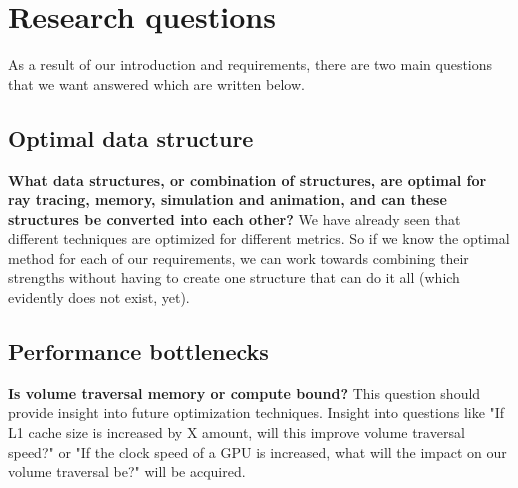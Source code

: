 \section{Research questions}\label{research_questions}
As a result of our introduction and requirements, there are two main questions that we want answered which are written below.

\subsection{Optimal data structure}\label{research_questions:optimal_data_structure}

\noindent\textbf{What data structures, or combination of structures, are optimal for ray tracing, memory, simulation and animation, and can these structures be converted into each other?} We have already seen that different techniques are optimized for different metrics. So if we know the optimal method for each of our requirements, we can work towards combining their strengths without having to create one structure that can do it all (which evidently does not exist, yet).

\subsection{Performance bottlenecks}\label{research_questions:performance_bottlenecks}
\noindent\textbf{Is volume traversal memory or compute bound?} This question should provide insight into future optimization techniques. Insight into questions like "If L1 cache size is increased by X amount, will this improve volume traversal speed?" or "If the clock speed of a GPU is increased, what will the impact on our volume traversal be?" will be acquired.
